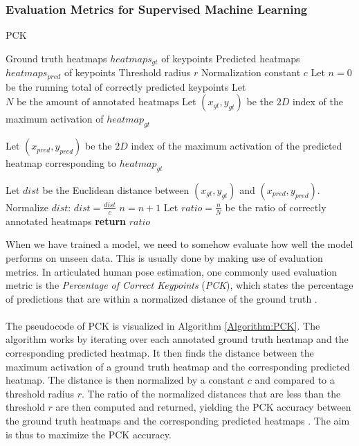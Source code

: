 \documentclass[./main.tex]{subfiles}
\begin{document}
\subsubsection{Evaluation Metrics for Supervised Machine Learning}
\begin{algorithm}[htbp]
    \caption{PCK \cite{Camilla}\cite{SHG}}
    \label{Algorithm:PCK}
    \begin{algorithmic}[1]
        \Require Ground truth heatmaps $heatmaps_{gt}$ of keypoints
        \Require Predicted heatmaps $heatmaps_{pred}$ of keypoints
        \Require Threshold radius $r$
        \Require Normalization constant $c$
        \State Let $n = 0$ be the running total of correctly predicted keypoints
        \State Let $N \text{ be the amount of annotated heatmaps}$
            \State Let $(x_{gt}, y_{gt})$ be the $2D$ index of the maximum activation of $heatmap_{gt}$
            \State \begin{varwidth}[t]{\linewidth}
                Let $(x_{pred}, y_{pred})$ be the $2D$ index of the maximum activation of the predicted heatmap corresponding to $heatmap_{gt}$
            \end{varwidth}
            \State Let $dist$ be the Euclidean distance between $(x_{gt}, y_{gt})$ and $(x_{pred}, y_{pred})$.
            \State Normalize $dist$: $dist = \frac{dist}{c}$
                \State $n = n + 1$
            \EndIf
        \EndFor
        \State Let $ratio = \frac{n}{N}$ be the ratio of correctly annotated heatmaps
        \State \textbf{return} $ratio$
    \end{algorithmic}
\end{algorithm}
\noindent When we have trained a model, we need to somehow evaluate how well the model performs on unseen data. This is usually done by making use of evaluation metrics. In articulated human pose estimation, one commonly used evaluation metric is the \textit{Percentage of Correct Keypoints} (\textit{PCK}), which states the percentage of predictions that are within a normalized distance of the ground truth \cite{SHG}.
\\
\\
The pseudocode of PCK is visualized in Algorithm \ref{Algorithm:PCK}. The algorithm works by iterating over each annotated ground truth heatmap and the corresponding predicted heatmap. It then finds the distance between the maximum activation of a ground truth heatmap and the corresponding predicted heatmap. The distance is then normalized by a constant $c$ and compared to a threshold radius $r$. The ratio of the normalized distances that are less than the threshold $r$ are then computed and returned, yielding the PCK accuracy between the ground truth heatmaps and the corresponding predicted heatmaps \cite{Camilla} \cite{SHG}. The aim is thus to maximize the PCK accuracy.
\end{document}

